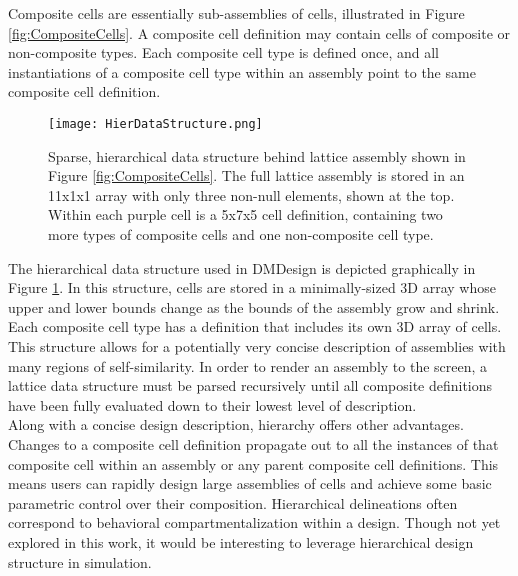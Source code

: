 {Composite cells are essentially sub-assemblies of cells, illustrated in Figure \ref{fig:CompositeCells}.  A composite cell definition may contain cells of composite or non-composite types.  Each composite cell type is defined once, and all instantiations of a composite cell type within an assembly point to the same composite cell definition.\\

\begin{figure}
  \texttt{[image: HierDataStructure.png]}
  \caption{Sparse, hierarchical data structure behind lattice assembly shown in Figure \ref{fig:CompositeCells}.  The full lattice assembly is stored in an 11x1x1 array with only three non-null elements, shown at the top. Within each purple cell is a 5x7x5 cell definition, containing two more types of composite cells and one non-composite cell type.}
  \label{fig:HierDataStructure}
\end{figure}

The hierarchical data structure used in DMDesign is depicted graphically in Figure \ref{fig:HierDataStructure}.  In this structure, cells are stored in a minimally-sized 3D array whose upper and lower bounds change as the bounds of the assembly grow and shrink.  Each composite cell type has a definition that includes its own 3D array of cells.  This structure allows for a potentially very concise description of assemblies with many regions of self-similarity.  In order to render an assembly to the screen, a lattice data structure must be parsed recursively until all composite definitions have been fully evaluated down to their lowest level of description.\\

Along with a concise design description, hierarchy offers other advantages.  Changes to a composite cell definition propagate out to all the instances of that composite cell within an assembly or any parent composite cell definitions.  This means users can rapidly design large assemblies of cells and achieve some basic parametric control over their composition.    Hierarchical delineations often correspond to behavioral compartmentalization within a design.  Though not yet explored in this work, it would be interesting to leverage hierarchical design structure in simulation.\\

}
